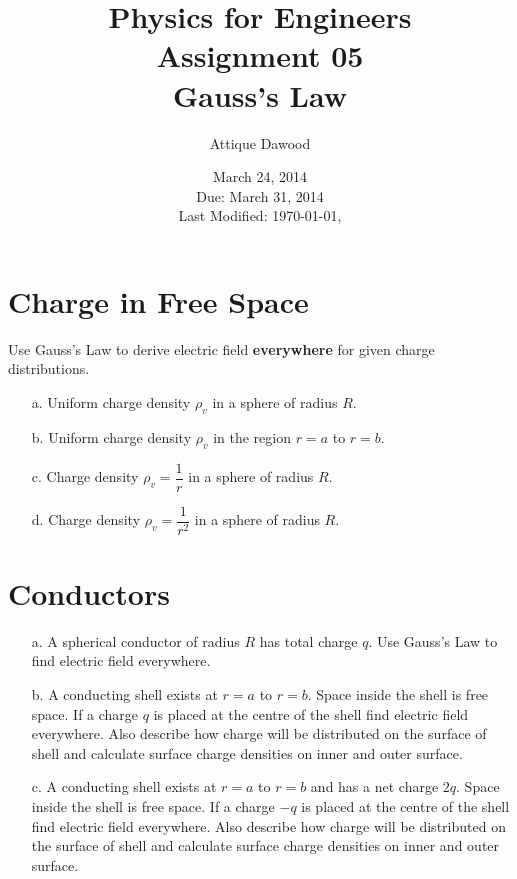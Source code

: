 \documentclass[12pt,a4paper]{article}
\title{\vspace{-3cm}Physics for Engineers\\Assignment 05\\Gauss's Law}
\author{Attique Dawood}
\date{March 24, 2014\\Due: March 31, 2014\\[0.2cm] Last Modified: \today, \currenttime}
\begin{document}
\maketitle
\section{Charge in Free Space}
Use Gauss's Law to derive electric field \textbf{everywhere} for given charge distributions.
\begin{itemize}
\item[a.] Uniform charge density $\rho_v$ in a sphere of radius $R$.
\item[b.] Uniform charge density $\rho_v$ in the region $r=a$ to $r=b$.
\item[c.] Charge density $\rho_v=\dfrac{1}{r}$ in a sphere of radius $R$.
\item[d.] Charge density $\rho_v=\dfrac{1}{r^2}$ in a sphere of radius $R$.
\end{itemize}
\section{Conductors}
\begin{itemize}
\item[a.] A spherical conductor of radius $R$ has total charge $q$. Use Gauss's Law to find electric field everywhere.
\item[b.] A conducting shell exists at $r=a$ to $r=b$. Space inside the shell is free space. If a charge $q$ is placed at the centre of the shell find electric field everywhere. Also describe how charge will be distributed on the surface of shell and calculate surface charge densities on inner and outer surface.
\item[c.] A conducting shell exists at $r=a$ to $r=b$ and has a net charge $2q$. Space inside the shell is free space. If a charge $-q$ is placed at the centre of the shell find electric field everywhere. Also describe how charge will be distributed on the surface of shell and calculate surface charge densities on inner and outer surface.
\end{itemize}
%
%
\end{document}
